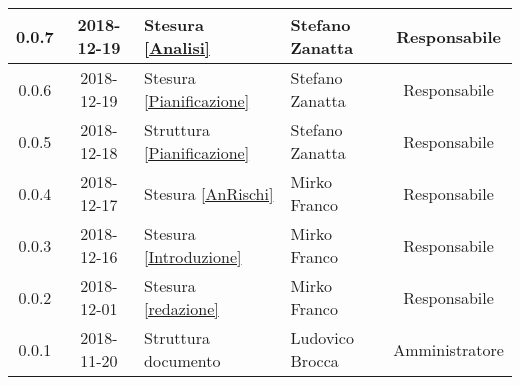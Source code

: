 \begin{center}
\begin{tabularx}{\textwidth}{|c|c|X|X|c|}
			\hline
			0.0.7 & 2018-12-19 & Stesura \ref{Analisi}& Stefano Zanatta & Responsabile\\
			\hline
			0.0.6 & 2018-12-19 & Stesura \ref{Pianificazione} & Stefano Zanatta & Responsabile\\
			\hline
			0.0.5 & 2018-12-18 & Struttura \ref{Pianificazione} & Stefano Zanatta & Responsabile\\
			\hline
			0.0.4 & 2018-12-17 & Stesura \ref{AnRischi} & Mirko Franco & Responsabile\\
			\hline
			0.0.3 & 2018-12-16 & Stesura \ref{Introduzione} & Mirko Franco& Responsabile\\
			\hline
			0.0.2 & 2018-12-01 & Stesura \ref{redazione} & Mirko Franco& Responsabile\\
			\hline
			0.0.1 & 2018-11-20 & Struttura documento & Ludovico Brocca & Amministratore\\			
			\hline
			
		\end{tabularx}
	\end{center}
\newpage